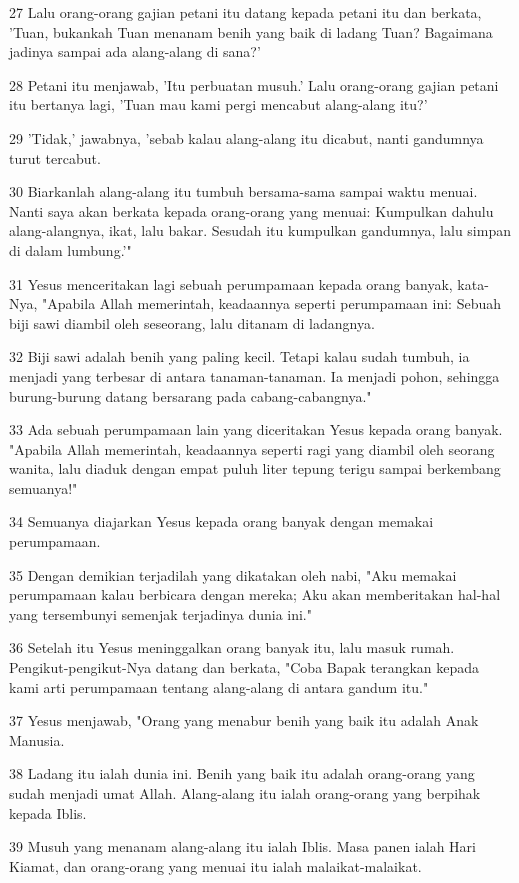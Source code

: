 \par 27 Lalu orang-orang gajian petani itu datang kepada petani itu dan berkata, 'Tuan, bukankah Tuan menanam benih yang baik di ladang Tuan? Bagaimana jadinya sampai ada alang-alang di sana?'
\par 28 Petani itu menjawab, 'Itu perbuatan musuh.' Lalu orang-orang gajian petani itu bertanya lagi, 'Tuan mau kami pergi mencabut alang-alang itu?'
\par 29 'Tidak,' jawabnya, 'sebab kalau alang-alang itu dicabut, nanti gandumnya turut tercabut.
\par 30 Biarkanlah alang-alang itu tumbuh bersama-sama sampai waktu menuai. Nanti saya akan berkata kepada orang-orang yang menuai: Kumpulkan dahulu alang-alangnya, ikat, lalu bakar. Sesudah itu kumpulkan gandumnya, lalu simpan di dalam lumbung.'"
\par 31 Yesus menceritakan lagi sebuah perumpamaan kepada orang banyak, kata-Nya, "Apabila Allah memerintah, keadaannya seperti perumpamaan ini: Sebuah biji sawi diambil oleh seseorang, lalu ditanam di ladangnya.
\par 32 Biji sawi adalah benih yang paling kecil. Tetapi kalau sudah tumbuh, ia menjadi yang terbesar di antara tanaman-tanaman. Ia menjadi pohon, sehingga burung-burung datang bersarang pada cabang-cabangnya."
\par 33 Ada sebuah perumpamaan lain yang diceritakan Yesus kepada orang banyak. "Apabila Allah memerintah, keadaannya seperti ragi yang diambil oleh seorang wanita, lalu diaduk dengan empat puluh liter tepung terigu sampai berkembang semuanya!"
\par 34 Semuanya diajarkan Yesus kepada orang banyak dengan memakai perumpamaan.
\par 35 Dengan demikian terjadilah yang dikatakan oleh nabi, "Aku memakai perumpamaan kalau berbicara dengan mereka; Aku akan memberitakan hal-hal yang tersembunyi semenjak terjadinya dunia ini."
\par 36 Setelah itu Yesus meninggalkan orang banyak itu, lalu masuk rumah. Pengikut-pengikut-Nya datang dan berkata, "Coba Bapak terangkan kepada kami arti perumpamaan tentang alang-alang di antara gandum itu."
\par 37 Yesus menjawab, "Orang yang menabur benih yang baik itu adalah Anak Manusia.
\par 38 Ladang itu ialah dunia ini. Benih yang baik itu adalah orang-orang yang sudah menjadi umat Allah. Alang-alang itu ialah orang-orang yang berpihak kepada Iblis.
\par 39 Musuh yang menanam alang-alang itu ialah Iblis. Masa panen ialah Hari Kiamat, dan orang-orang yang menuai itu ialah malaikat-malaikat.
